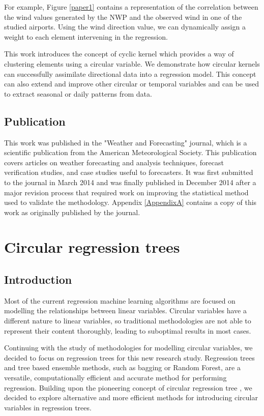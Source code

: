 For example, Figure \ref{paper1} contains a representation of the correlation between the wind values generated by the NWP and the observed wind in one of the studied airports. Using the wind direction value, we can dynamically assign a weight to each element intervening in the regression.

This work introduces the concept of cyclic kernel which provides a way of clustering elements using a circular variable. We demonstrate how circular kernels can  successfully assimilate
directional data into a regression model. This concept can also extend and improve other circular or temporal variables and can be used to extract seasonal or daily patterns from data.

\subsection{Publication}

This work was published in the "Weather and Forecasting" journal, which is a scientific publication from the American Meteorological Society. This publication covers articles on weather forecasting and analysis techniques, forecast verification studies, and case studies useful to forecasters. It was first submitted to the journal in March 2014 and was finally published in December 2014 after a major revision process that required work on improving the statistical method used to validate the methodology. Appendix \ref{AppendixA} contains a copy of this work as originally published by the journal.



\section{Circular regression trees}

\subsection{Introduction}

Most of the current regression machine learning algorithms are focused on modelling the relationships between linear variables. Circular variables have a different nature to linear variables, so traditional methodologies are not able to represent their content thoroughly, leading to suboptimal results in most cases.

Continuing with the study of methodologies for modelling circular variables, we decided to focus on regression trees for this new research study. Regression trees and tree based ensemble methods, such as bagging or Random Forest, are a versatile, computationally efficient and accurate method for performing regression. Building upon the pioneering concept of circular regression tree \citep{lund2002tree}, we decided to explore alternative and more efficient methods for introducing circular variables in regression trees.

